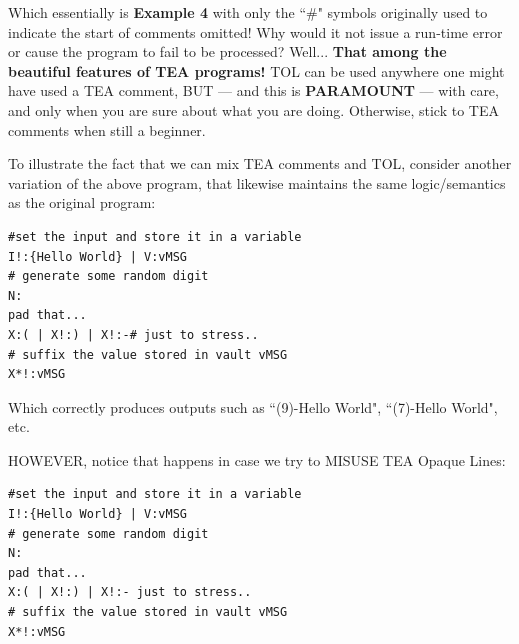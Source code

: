 \documentclass[a4paper, 18pt]{book} %
\begin{document}
{{{\begin{appendices}
Which essentially is \textbf{Example 4} with only the ``\#" symbols originally used to indicate the start of comments omitted! Why would it not issue a run-time error or cause the program to fail to be processed? Well... \textbf{That among the beautiful features of TEA programs!} TOL can be used anywhere one might have used a TEA comment, BUT --- and this is \textbf{PARAMOUNT} --- with care, and only when you are sure about what you are doing. Otherwise, stick to TEA comments when still a beginner.

\vspace{2em}

To illustrate the fact that we can mix TEA comments and TOL, consider another variation of the above program, that likewise maintains the same logic/semantics as the original program:




\vspace{2em}

  \begin{tcolorbox}[teaterminalstyle, title=TEA COMMENTS: Example 6: Program with comments and TOL, breakable]
  \begin{lstlisting}[language=TEA,breaklines=true,]
#set the input and store it in a variable
I!:{Hello World} | V:vMSG
# generate some random digit
N:
pad that... 
X:( | X!:) | X!:-# just to stress..
# suffix the value stored in vault vMSG
X*!:vMSG
   \end{lstlisting}
  \end{tcolorbox}

\vspace{2em}

Which correctly produces outputs such as ``(9)-Hello World", ``(7)-Hello World", etc.

\vspace{2em}

HOWEVER, notice that happens in case we try to MISUSE TEA Opaque Lines:


\vspace{2em}

  \begin{tcolorbox}[teaterminalstyle, title=TEA COMMENTS: Example 7: Program with comments and TOL, breakable]
  \begin{lstlisting}[language=TEA,breaklines=true,]
#set the input and store it in a variable
I!:{Hello World} | V:vMSG
# generate some random digit
N:
pad that... 
X:( | X!:) | X!:- just to stress..
# suffix the value stored in vault vMSG
X*!:vMSG
   \end{lstlisting}
  \end{tcolorbox}


\end{appendices}}}}
\end{document}
